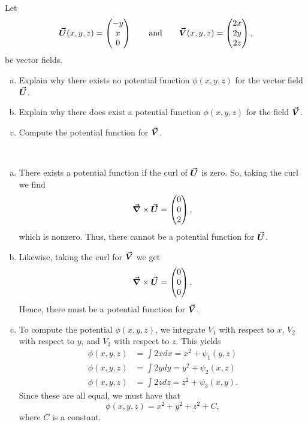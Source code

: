 \documentclass[12pt]{article} %
\begin{document}
\newpage
\begin{problem}
	Let 
	\[
	\boldsymbol{\vec{U}}(x,y,z) = \begin{pmatrix} -y \\ x \\ 0 \end{pmatrix} \qquad \textrm{and} \qquad \boldsymbol{\vec{V}}(x,y,z) = \begin{pmatrix} 2x \\ 2y \\ 2z \end{pmatrix},
	\] 
	be vector fields.  
	\begin{enumerate}[(a)]
		\item Explain why there exists no potential function $\phi(x,y,z)$ for the vector field $\boldsymbol{\vec{U}}$.
		\item Explain why there does exist a potential function $\phi(x,y,z)$ for the field $\boldsymbol{\vec{V}}$.
		\item Compute the potential function for $\boldsymbol{\vec{V}}$.
	\end{enumerate}
\end{problem}
\begin{solution}~
    \begin{enumerate}[(a)]
        \item There exists a potential function if the curl of $\boldsymbol{\vec{U}}$ is zero.  So, taking the curl we find
        \[
        \boldsymbol{\vec{\nabla}} \times \boldsymbol{\vec{U}} = \begin{pmatrix} 0 \\ 0 \\ 2 \end{pmatrix},
        \]
        which is nonzero. Thus, there cannot be a potential function for $\boldsymbol{\vec{U}}$.
        
        \item Likewise, taking the curl for $\boldsymbol{\vec{V}}$ we get
        \[
            \boldsymbol{\vec{\nabla}}\times \boldsymbol{\vec{U}} = \begin{pmatrix} 0 \\ 0 \\ 0 \end{pmatrix}.
        \]
        Hence, there must be a potential function for $\boldsymbol{\vec{V}}$.  
        
        \item To compute the potential $\phi(x,y,z)$, we integrate $V_1$ with respect to $x$, $V_2$ with respect to $y$, and $V_3$ with respect to $z$.  This yields
        \begin{align*}
            \phi(x,y,z) &= \int 2x dx = x^2+\psi_1(y,z)\\
            \phi(x,y,z) &= \int 2y dy = y^2+\psi_2(x,z)\\
            \phi(x,y,z) &= \int 2z dz = z^2+\psi_3(x,y).
        \end{align*}
        Since these are all equal, we must have that
        \[
        \phi(x,y,z) = x^2+y^2+z^2+C,
        \]
        where $C$ is a constant.
    \end{enumerate}
\end{solution}
\end{document}
